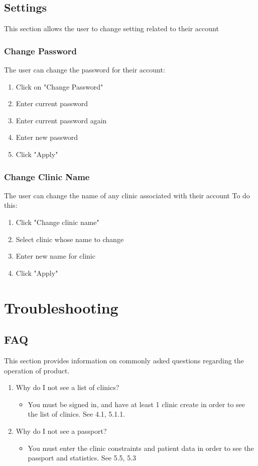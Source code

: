 \documentclass[12pt]{article}
\begin{document}
\subsection{Settings}
This section allows the user to change setting related to their account

\subsubsection{Change Password}
The user can change the password for their account: \\
\begin{enumerate}
\item Click on "Change Password"
\item  Enter current password
\item Enter current password again
\item  Enter new password
\item  Click "Apply"
\end{enumerate}
\subsubsection{Change Clinic Name}
The user can change the name of any clinic associated with their account
To do this: \\
\begin{enumerate}
\item Click "Change clinic name"
\item  Select clinic whose name to change
\item Enter new name for clinic
\item Click "Apply"
\end{enumerate}

\section{Troubleshooting}
\subsection{FAQ}
This section provides information on commonly asked questions regarding the operation of product. \\
\begin{enumerate}
\item  Why do I not see a list of clinics?
\begin{itemize}
\item You must be signed in, and have at least 1 clinic create in order to see the list of clinics. See 4.1, 5.1.1.
\end{itemize}

\item  Why do I not see a passport?
\begin{itemize}
\item You must enter the clinic constraints and patient data in order to see the passport and statistics. See 5.5, 5.3
\end{itemize}
\end{enumerate}
\end{document}
